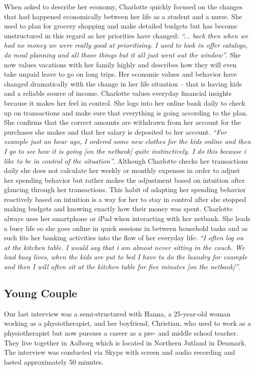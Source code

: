 When asked to describe her economy, Charlotte quickly focused on the changes that had happened economically between her life as a student and a nurse. She used to plan for grocery shopping and make detailed budgets but has become unstructured in this regard as her priorities have changed: \emph{“... back then when we had no money we were really good at prioritising. I used to look in offer catalogs, do meal planning and all those things but it all just went out the window”}. She now values vacations with her family highly and describes how they will even take unpaid leave to go on long trips. Her economic values and behavior have changed dramatically with the change in her life situation -- that is having kids and a reliable source of income.
Charlotte values everyday financial insights because it makes her feel in control. She logs into her online bank daily to check up on transactions and make sure that everything is going according to the plan. She confirms that the correct amounts are withdrawn from her account for the purchases she makes and that her salary is deposited to her account. \emph{“For example just an hour ago, I ordered some new clothes for the kids online and then I go to see how it is going [on the netbank] quite instinctively. I do this because i like to be in control of the situation”}. Although Charlotte checks her transactions daily she does not calculate her weekly or monthly expenses in order to adjust her spending behavior but rather makes the adjustment based on intuition after glancing through her transactions. This habit of adapting her spending behavior reactively based on intuition is a way for her to stay in control after she stopped making budgets and knowing exactly how their money was spent.
Charlotte always uses her smartphone or iPad when interacting with her netbank. She leads a busy life so she goes online in quick sessions in between household tasks and as such fits her banking activities into the flow of her everyday life: \emph{“I often log on at the kitchen table. I would say that i am almost never sitting in the couch. We lead busy lives, when the kids are put to bed I have to do the laundry for example and then I will often sit at the kitchen table for five minutes [on the netbank]”}.

\subsection{Young Couple}
Our last interview was a semi-structured with Hanna, a 25-year-old woman working as a physiotherapist, and her boyfriend, Christian, who used to work as a physiotherapist but now pursues a career as a pre- and middle school teacher. They live together in Aalborg which is located in Northern Jutland in Denmark. The interview was conducted via Skype with screen and audio recording and lasted approximately 50 minutes.

